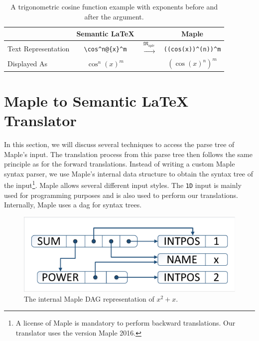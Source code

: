 \documentclass[a4paper,11pt]{article}
\newcommand{\Maple}{Maple}
\newcommand{\langMaple}{\mathfrak{M}_{aple}}
\theoremstyle{defTheoStyle}
\theoremstyle{defExampStyle}
\begin{document}
	\begin{table}[ht]
		\centering
		\begin{tabular}{lccc}
			& Semantic \LaTeX & & \Maple{} \\
			\hline
			Text Representation & \rule{0pt}{1.0\normalbaselineskip} \verb|\cos^n@{x}^m| & $\overset{\langMaple}{\mapsto}$ & \verb|((cos(x))^(n))^m| \\
			Displayed As & \rule{0pt}{1.0\normalbaselineskip} $\cos^n(x)^m$ & & $\left( \cos(x)^n \right)^m$ \\
			\hline
		\end{tabular}
		\caption{A trigonometric cosine function example with exponents before and after the argument.}
		\label{tab:multi-expo}
	\end{table}
	
	\section{\Maple{} to Semantic \LaTeX{} Translator}\label{sec:backward-translation}
	In this section, we will discuss several techniques to access the parse tree of \Maple's input. The translation process from this parse tree then follows the same principle as for the forward translations. Instead of writing a custom \Maple{} syntax parser, we use \Maple's internal data structure to obtain the syntax tree of the input\footnote{A license of \Maple{} is mandatory to perform backward translations. Our translator uses the version \Maple{} 2016.}. \Maple{} allows several different input styles. The \texttt{1D} input is mainly used for programming purposes 
	and is also used to perform our translations. Internally, \Maple{} uses a \gls*{dag} for syntax trees.
	
	\begin{figure}
		\vspace{-15pt}
		\centering
		\includegraphics[clip, trim=0.5cm 0.5cm 0.5cm 0.5cm, scale=0.5]{DAGreal.pdf}
		\vspace{-5pt}
		\caption{The internal \Maple{} DAG representation of $x^2+x$.}
		\label{fig:internal-maple-dag}
	\end{figure}
	
\end{document}
